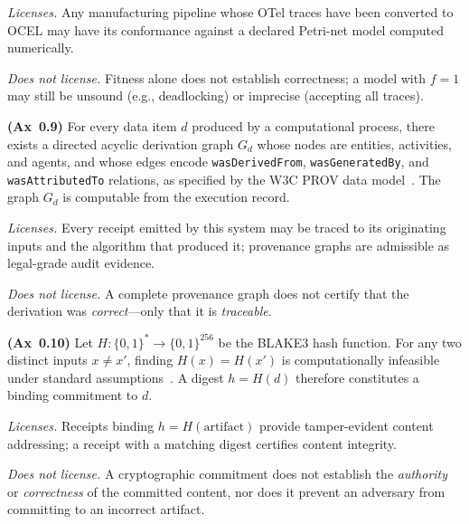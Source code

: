 \noindent\textit{Licenses.}
Any manufacturing pipeline whose OTel traces have been converted to OCEL may
have its conformance against a declared Petri-net model computed numerically.

\noindent\textit{Does not license.}
Fitness alone does not establish correctness; a model with $f = 1$ may still
be unsound (e.g., deadlocking) or imprecise (accepting all traces).

\begin{axiom}[Provenance]\label{ax:provenance}
\textbf{(Ax~0.9)}
For every data item $d$ produced by a computational process, there exists a
directed acyclic derivation graph $G_d$ whose nodes are entities, activities,
and agents, and whose edges encode \texttt{wasDerivedFrom},
\texttt{wasGeneratedBy}, and \texttt{wasAttributedTo} relations, as specified
by the W3C PROV data model~\cite{moreau2013prov}.
The graph $G_d$ is computable from the execution record.
\end{axiom}

\noindent\textit{Licenses.}
Every receipt emitted by this system may be traced to its originating inputs
and the algorithm that produced it; provenance graphs are admissible as
legal-grade audit evidence.

\noindent\textit{Does not license.}
A complete provenance graph does not certify that the derivation was
\emph{correct}—only that it is \emph{traceable}.

\begin{axiom}\label{ax:hash}
\textbf{(Ax~0.10)}
Let $H : \{0,1\}^* \to \{0,1\}^{256}$ be the BLAKE3 hash function.
For any two distinct inputs $x \neq x'$, finding $H(x) = H(x')$ is
computationally infeasible under standard assumptions~\cite{blake3_2020}.
A digest $h = H(d)$ therefore constitutes a binding commitment to $d$.
\end{axiom}

\noindent\textit{Licenses.}
Receipts binding $h = H(\text{artifact})$ provide tamper-evident content
addressing; a receipt with a matching digest certifies content integrity.

\noindent\textit{Does not license.}
A cryptographic commitment does not establish the \emph{authority} or
\emph{correctness} of the committed content, nor does it prevent an adversary
from committing to an incorrect artifact.

